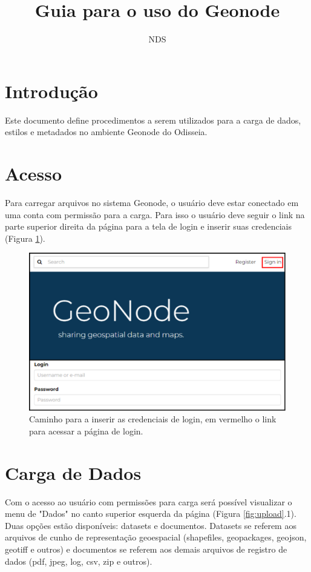 \documentclass[12pt]{article}
\title{Guia para o uso do Geonode}
\author{NDS\inst{1}}
\begin{document}
 

\maketitle


\section{Introdução}

Este documento define procedimentos a serem utilizados para a carga de dados,
estilos e metadados no ambiente Geonode do Odisseia.

\section{Acesso} \label{sec:firstpage}

Para carregar arquivos no sistema Geonode, o usuário deve estar conectado em
uma conta com permissão para a carga. Para isso o usuário deve seguir o link na
parte superior direita da página para a tela de login e inserir suas
credenciais (Figura \ref{fig:login}).

\begin{figure}[h]
  \centering
  \includegraphics[width=\textwidth, keepaspectratio]{img/login.pdf}
  \caption{Caminho para a inserir as credenciais de login, em vermelho o link para acessar a página de login.}
  \label{fig:login}
\end{figure}


\section{Carga de Dados}

Com o acesso ao usuário com permissões para carga será possível visualizar o
menu de "Dados" no canto superior esquerda da página (Figura
\ref{fig:upload}.1). Duas opções estão disponíveis: datasets e documentos.
Datasets se referem aos arquivos de cunho de representação geoespacial
(shapefiles, geopackages, geojson, geotiff e outros) e documentos se referem
aos demais arquivos de registro de dados (pdf, jpeg, log, csv, zip e outros).
\end{document}
